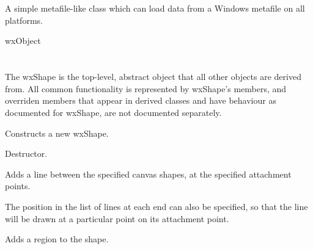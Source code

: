 \section{}\label{wxpseudometafile}

A simple metafile-like class which can load data from a Windows metafile on all platforms.


wxObject

\section{}\label{wxshape}

The wxShape is the top-level, abstract object that all other
objects are derived from. All common functionality is represented by
wxShape's members, and overriden members that appear in derived
classes and have behaviour as documented for wxShape, are not
documented separately.






Constructs a new wxShape.



Destructor.



Adds a line between the specified canvas shapes, at the specified attachment points.

The position in the list of lines at each end can also be specified, so that the line will be drawn
at a particular point on its attachment point.



Adds a region to the shape.

